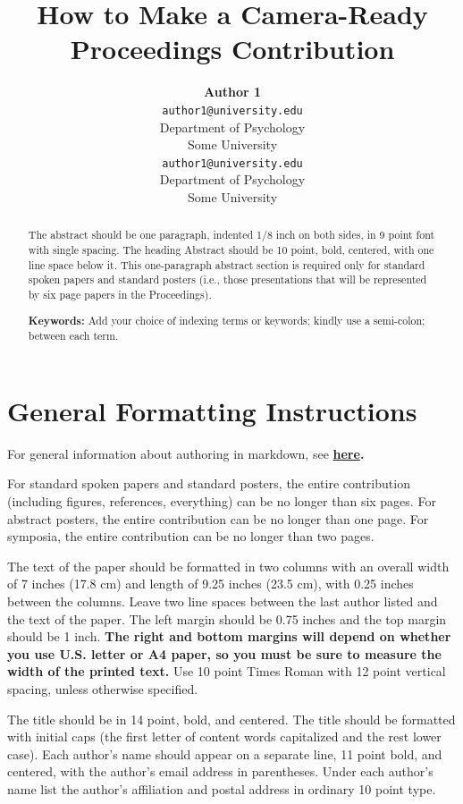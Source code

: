\documentclass[10pt, letterpaper]{article}
\title{How to Make a Camera-Ready Proceedings Contribution}
\author{{\large \bf Author 1} \\ \texttt{author1@university.edu} \\ Department of Psychology \\ Some University \And {\large \bf Author 2} \\ \texttt{author1@university.edu} \\ Department of Psychology \\ Some University}
\begin{document}
\maketitle

\begin{abstract}
The abstract should be one paragraph, indented 1/8 inch on both sides,
in 9 point font with single spacing. The heading Abstract should be 10
point, bold, centered, with one line space below it. This one-paragraph
abstract section is required only for standard spoken papers and
standard posters (i.e., those presentations that will be represented by
six page papers in the Proceedings).

\textbf{Keywords:}
Add your choice of indexing terms or keywords; kindly use a semi-colon;
between each term.
\end{abstract}

\section{General Formatting
Instructions}\label{general-formatting-instructions}

For general information about authoring in markdown, see
\textbf{\href{http://rmarkdown.rstudio.com/authoring_basics.html}{here}.}

For standard spoken papers and standard posters, the entire contribution
(including figures, references, everything) can be no longer than six
pages. For abstract posters, the entire contribution can be no longer
than one page. For symposia, the entire contribution can be no longer
than two pages.

The text of the paper should be formatted in two columns with an overall
width of 7 inches (17.8 cm) and length of 9.25 inches (23.5 cm), with
0.25 inches between the columns. Leave two line spaces between the last
author listed and the text of the paper. The left margin should be 0.75
inches and the top margin should be 1 inch.
\textbf{The right and bottom margins will depend on whether you use
U.S. letter or A4 paper, so you must be sure to measure the width of
the printed text.} Use 10 point Times Roman with 12 point vertical
spacing, unless otherwise specified.

The title should be in 14 point, bold, and centered. The title should be
formatted with initial caps (the first letter of content words
capitalized and the rest lower case). Each author's name should appear
on a separate line, 11 point bold, and centered, with the author's email
address in parentheses. Under each author's name list the author's
affiliation and postal address in ordinary 10 point type.
\end{document}
